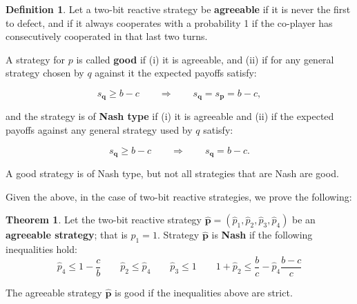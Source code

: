 \documentclass{article}
\theoremstyle{definition}
\newtheorem{definition}{Definition}[section]
\newtheorem{theorem}{Theorem}[section]
\begin{document}
\begin{definition}
Let a two-bit reactive strategy be \textbf{agreeable} if it is never the first to
defect, and if it always cooperates with a probability 1 if the co-player has
consecutively cooperated in that last two turns.

A strategy for \(p\) is called \textbf{good} if
(i) it is agreeable, and (ii) if for any general strategy chosen by \(q\)
against it the expected payoffs satisfy:

\vspace{-.5cm}

\begin{equation}
    s_{\mathbf{q}} \geq b\!-\!c \qquad \Rightarrow \qquad s_{\mathbf{q}} = s_{\mathbf{p}} =  b\!-\!c,
\end{equation}

and the strategy is of \textbf{Nash type} if (i) it is agreeable and (ii)
if the expected payoffs against any general strategy used by \(q\) satisfy:

\vspace{-.5cm}

\begin{equation}
    s_{\mathbf{q}} \geq b\!-\!c \qquad \Rightarrow \qquad s_{\mathbf{q}} =  b\!-\!c.
\end{equation}

A good strategy is of Nash type, but not all strategies that are Nash are good.
\end{definition}

Given the above, in the case of two-bit reactive strategies, we prove the
following:

\begin{theorem}\label{theorem:two_bit_nash_and_good}
    Let the two-bit reactive strategy \(\mathbf{\hat{p}} = (\hat{p}_{1}, \hat{p}_{2}, \hat{p}_{3}, \hat{p}_{4})\) be an \textbf{agreeable
    strategy}; that is \(\hat{p}_1 = 1\). Strategy \(\mathbf{\hat{p}}\) is \textbf{Nash} if the
    following inequalities hold:
    \begin{equation*}
        \hat{p}_4 \leq 1 - \frac{c}{b} \qquad  \hat{p}_2  \leq \hat{p}_4 \qquad \hat{p}_3 \leq 1 \qquad 1 + \hat{p}_2 \leq \frac{b}{c} - \hat{p}_4 \frac{b\!-\!c}{c}
    \end{equation*}
    
    The agreeable strategy \(\mathbf{\hat{p}}\) is good if the inequalities above are strict.
    \end{theorem}
    
\end{document}
